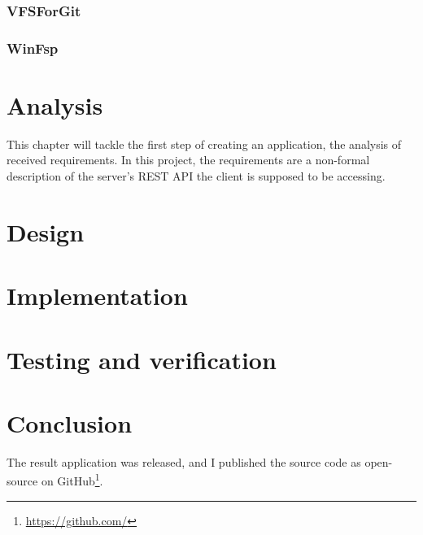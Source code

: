 \subsection*{VFSForGit}
\cite{GitVfsForGit}

\subsection*{WinFsp}
\cite{GitWinFsp}

\chapter{Analysis}
\label{ch4}
This chapter will tackle the first step of creating an application, the analysis of received requirements. In this project, the requirements are a non-formal description of the server's REST API the client is supposed to be accessing.
\chapter{Design}
\label{ch5}

\chapter{Implementation}
\label{ch6}

\chapter{Testing and verification}
\label{ch7}

\chapter{Conclusion}
\label{ch8}

The result application was released, and I published the source code as open-source on GitHub\footnote{\url{https://github.com/}}.

 